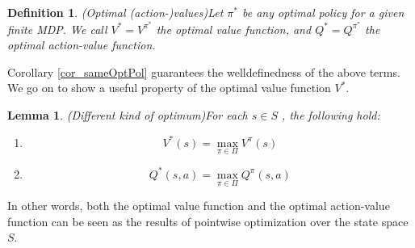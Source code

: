 \documentclass[11pt]{article} %
\newtheorem{lem}{Lemma}
\newtheorem{defn}{Definition}
\begin{document}
\begin{defn}{(Optimal (action-)values)}\label{def_uniqueOptActVal}
	Let $\pi^*$ be any optimal policy for a given finite MDP. We call $V^* = V^{\pi^*}$ the optimal value function, and $Q^* = Q^{\pi^*}$ the optimal action-value function.
\end{defn}

Corollary \ref{cor_sameOptPol} guarantees the welldefinedness of the above terms. We go on to show a useful property of the optimal value function $V^*$.

\begin{lem}{(Different kind of optimum)}\label{cor_optValMaxS}
	For each $s \in S$ , the following hold:
	\begin{enumerate}
		\item \begin{equation}\label{eq_optValMax} V^*(s) = \max_{\pi \in \Pi} V^{\pi}(s) \end{equation}
		\item \begin{equation}\label{eq_optActValMax} Q^*(s,a) = \max_{\pi \in \Pi} Q^{\pi}(s,a) \end{equation}
	\end{enumerate}
\end{lem}

In other words, both the optimal value function and the optimal action-value function can be seen as the results of pointwise optimization over the state space $S$.
\end{document}

